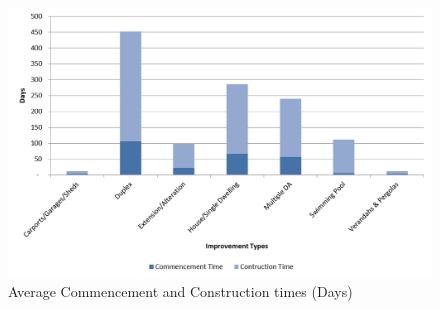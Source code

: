 \documentclass{article}
\begin{document}
\begin{figure}[!h]
    \centering
     \includegraphics[width=\columnwidth]{Figures/Cm_ct_times.png} \par
 \caption{Average Commencement and Construction times (Days)}
 \label{fig:Cm_ct_times}
\end{figure}




%
\end{document}
